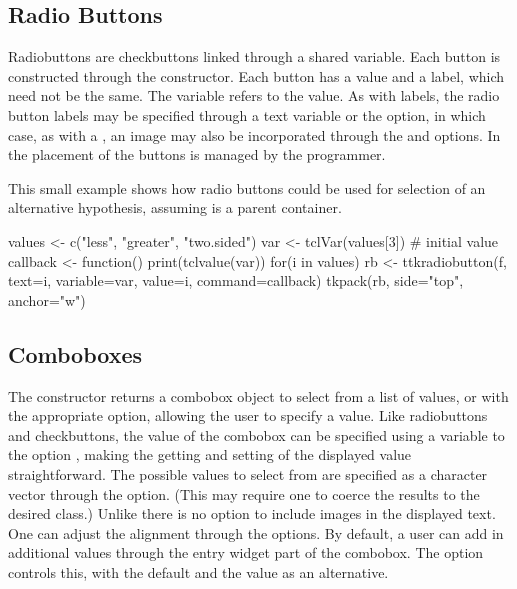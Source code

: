
\subsection{Radio Buttons}
\label{sec:tcltk:radio-buttons}

Radiobuttons are checkbuttons linked through a shared \TCL\/ variable. Each button is constructed
through the  constructor. Each button has a value and a
label, which need not be the same. The variable refers to the
value. As with labels, the radio button labels may be specified
through a text variable or the  option,
in which case, as with a , an image may also be incorporated through the
 and  options. In \TK\/ the placement of the buttons is managed by the programmer.


This small example shows how radio buttons could be used for selection
of an alternative hypothesis, assuming  is a parent container.

\begin{Schunk}
\begin{Sinput}
 values <- c("less", "greater", "two.sided")
 var <- tclVar(values[3])                # initial value
 callback <- function() print(tclvalue(var))
 for(i in values) {
   rb <- ttkradiobutton(f, text=i, variable=var, value=i,
                        command=callback)
   tkpack(rb, side="top", anchor="w")
 }
\end{Sinput}
\end{Schunk}


\subsection{Comboboxes}
\label{sec:tcltk:comboboxes}

The  constructor returns a combobox object to
select from a list of values, or with the appropriate option, allowing
the user to specify a value. Like radiobuttons and checkbuttons, the
value of the combobox can be specified using a \TCL\/ variable to the
option , making the getting and
setting of the displayed value straightforward. The possible values to
select from are specified as a character vector through the
 option. (This may require one to coerce
the results to the desired class.) Unlike \GTK\/ there is no option to
include images in the displayed text. One can adjust the alignment
through the  options.  By default, a user
can add in additional values through the entry widget part of the
combobox. The  option controls this, with
the default   and the value  as an
alternative.

